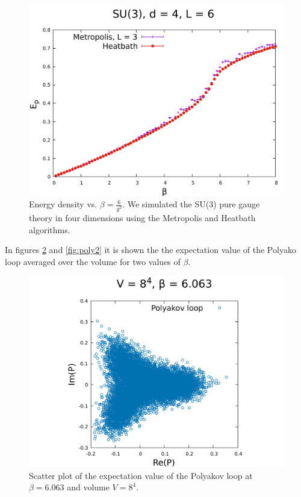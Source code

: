 \documentclass[12pt,a4paper]{article}
\begin{document}
\begin{center}
\begin{figure}
\includegraphics[scale=0.6]{../images/L=6_heatbath_L=3_metropolis.pdf}
\caption{Energy density vs. $\beta = \frac{6}{g^2}$. We simulated the SU(3) pure gauge theory in four dimensions using the Metropolis and Heatbath algorithms.}
\label{fig:Ep}
\end{figure}
\end{center}

In figures \ref{fig:poly} and  \ref{fig:poly2} it is shown the the expectation value of the Polyako loop averaged over the volume for two values of $\beta$.


\begin{center}
\begin{figure}
\includegraphics[scale=0.6]{../images/polyakov_loop.pdf}
\caption{Scatter plot of the expectation value of the Polyakov loop at $\beta = 6.063$ and volume $V = 8^4$.}
\label{fig:poly}
\end{figure}
\end{center}
\end{document}
